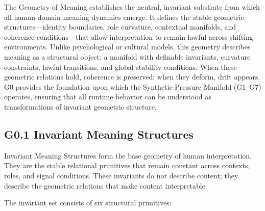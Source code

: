 
\medskip

\noindent The Geometry of Meaning establishes the neutral, invariant substrate
from which all human-domain meaning dynamics emerge. It defines the stable
geometric structures—identity boundaries, role curvature, contextual manifolds,
and coherence conditions—that allow interpretation to remain lawful across
shifting environments. Unlike psychological or cultural models, this geometry
describes meaning as a structural object: a manifold with definable invariants,
curvature constraints, lawful transitions, and global stability conditions.
When these geometric relations hold, coherence is preserved; when they deform,
drift appears. G0 provides the foundation upon which the Synthetic-Pressure
Manifold (G1--G7) operates, ensuring that all runtime behavior can be understood
as transformations of invariant geometric structure.

\medskip

\subsection*{G0.1 Invariant Meaning Structures}

\noindent Invariant Meaning Structures form the base geometry of human
interpretation. They are the stable relational primitives that remain constant
across contexts, roles, and signal conditions. These invariants do not describe
content; they describe the geometric relations that make content interpretable.

\medskip

\noindent The invariant set consists of six structural primitives:

